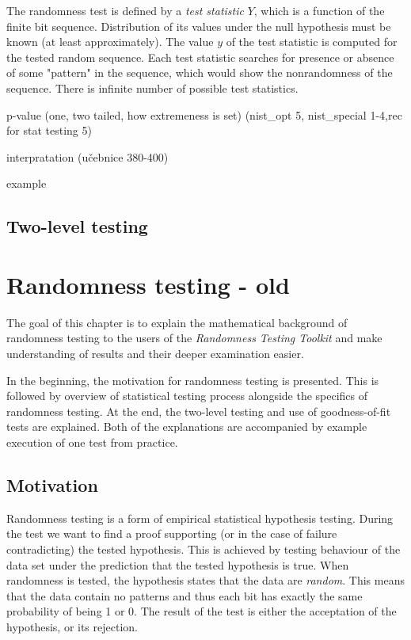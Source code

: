 \documentclass[
  digital,     %
  oneside,     %
  nosansbold,  %
  nocolorbold, %
  nolof,         %
  nolot,         %
]{fithesis4}
\begin{document}
The randomness test is defined by a \emph{test statistic} $Y$, which is a function of the finite bit sequence. Distribution of its values under the null hypothesis must be known (at least approximately). The value $y$ of the test statistic is computed for the tested random sequence. Each test statistic searches for presence or absence of some "pattern" in the sequence, which would show the nonrandomness of the sequence. There is infinite number of possible test statistics. \cite[p. 4]{tu01_paper}

p-value (one, two tailed, how extremeness is set) (nist_opt 5, nist_special 1-4,rec for stat testing 5)

interpratation (učebnice 380-400)

example



\section{Two-level testing}



\chapter{Randomness testing - old}

The goal of this chapter is to explain the mathematical background of randomness testing to the users of the \emph{Randomness Testing Toolkit} and make understanding of results and their deeper examination easier.

In the beginning, the motivation for randomness testing is presented. This is followed by overview of statistical testing process alongside the specifics of randomness testing. At the end, the two-level testing and use of goodness-of-fit tests are explained. Both of the explanations are accompanied by example execution of one test from practice. 

\section{Motivation}

Randomness testing is a form of empirical statistical hypothesis testing. During the test we want to find a proof supporting (or in the case of failure contradicting) the tested hypothesis. This is achieved by testing behaviour of the data set under the prediction that the tested hypothesis is true. When randomness is tested, the hypothesis states that the data are \emph{random}. This means that the data contain no patterns and thus each bit has exactly the same probability of being 1 or 0. The result of the test is either the acceptation of the hypothesis, or its rejection.
\end{document}
